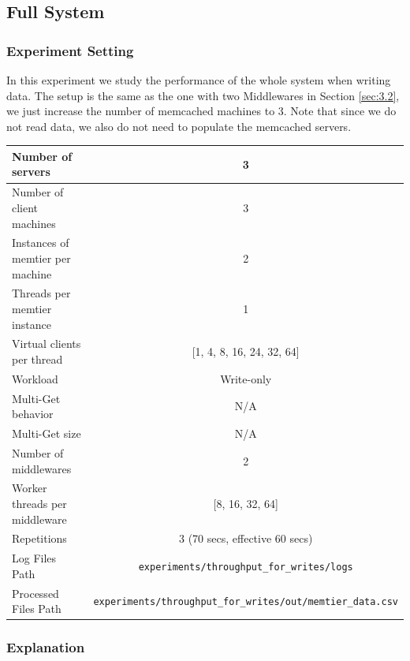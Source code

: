 \documentclass[11pt,a4paper]{article}
\begin{document}
\subsection{Full System}

\subsubsection*{Experiment Setting}

In this experiment we study the performance of the whole system when writing data.
The setup is the same as the one with two Middlewares in Section \ref{sec:3.2}, we just increase the number of memcached machines to 3. Note that since we do not read data, we also do not need to populate the memcached servers.

\begin{center}
	\scriptsize{
		\begin{tabular}{|l|c|}
			\hline Number of servers                & 3          \\ 
			\hline Number of client machines        & 3          \\ 
			\hline Instances of memtier per machine & 2          \\ 
			\hline Threads per memtier instance     & 1          \\
			\hline Virtual clients per thread       & [1, 4, 8, 16, 24, 32, 64]    \\ 
			\hline Workload                         & Write-only \\
			\hline Multi-Get behavior               & N/A        \\
			\hline Multi-Get size                   & N/A        \\
			\hline Number of middlewares            & 2          \\
			\hline Worker threads per middleware    & [8, 16, 32, 64]    \\
            \hline Repetitions                      & 3 (70 secs, effective 60 secs) \\ 
            \hline Log Files Path                   & \texttt{experiments/throughput\_for\_writes/logs} \\
            \hline Processed Files Path             & \texttt{experiments/throughput\_for\_writes/out/memtier\_data.csv}\\
            \hline
		\end{tabular}
	} 
\end{center}

\subsubsection{Explanation}
\end{document}
